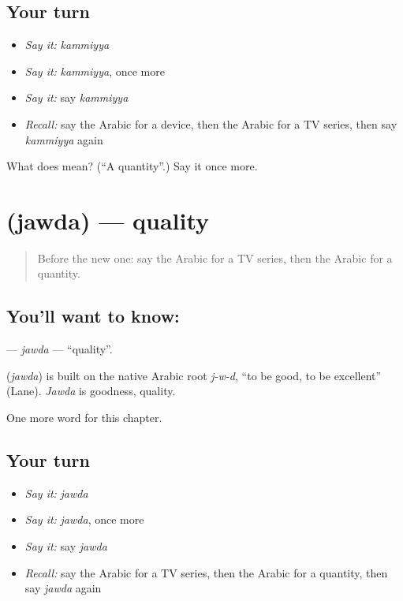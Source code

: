 \subsection*{Your turn}
\begin{itemize}
\raggedright
  \item \emph{Say it:} \emph{kammiyya}
  \item \emph{Say it:} \emph{kammiyya}, once more
  \item \emph{Say it:} say \emph{kammiyya}
  \item \emph{Recall:} say the Arabic for a device, then the Arabic for a TV series, then say \emph{kammiyya} again
\end{itemize}

\begin{tcolorbox}[breakable,colback=teal!4,colframe=teal!35!black,title={Before you move on}]
What does  mean? (\textquotedblleft{}A quantity\textquotedblright{}.) Say it once more.
\end{tcolorbox}
\section[\texorpdfstring{\ar{جودة} (jawda)}{جودة (jawda)}]{ (jawda) — quality}

\label{lesson:AR-C249-jawda}



\begin{quote}
Before the new one: say the Arabic for a TV series, then the Arabic for a quantity.
\end{quote}

\subsection*{You'll want to know: }
\textbf{} — \emph{jawda} — \textquotedblleft{}quality\textquotedblright{}.

\begin{cousinweb}
\textbf{} (\emph{jawda}) is built on the native Arabic root \emph{j-w-d}, \textquotedblleft{}to be good, to be excellent\textquotedblright{} (Lane). \emph{Jawda} is goodness, quality.
\end{cousinweb}

\begin{grammarlens}[title={What you've built}]
One more word for this chapter.
\end{grammarlens}

\subsection*{Your turn}
\begin{itemize}
\raggedright
  \item \emph{Say it:} \emph{jawda}
  \item \emph{Say it:} \emph{jawda}, once more
  \item \emph{Say it:} say \emph{jawda}
  \item \emph{Recall:} say the Arabic for a TV series, then the Arabic for a quantity, then say \emph{jawda} again
\end{itemize}

